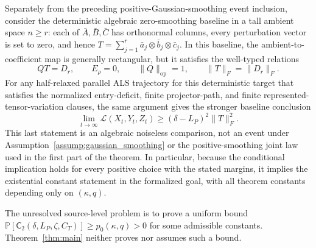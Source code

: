 \begin{theorem}
Separately from the preceding positive-Gaussian-smoothing event inclusion,
consider the deterministic algebraic zero-smoothing baseline in a tall
ambient space $n\geq r$: each of $\bar A,\bar B,\bar C$ has orthonormal
columns, every perturbation vector is set to zero, and hence
$T=\sum_{j=1}^r\bar a_j\otimes\bar b_j\otimes\bar c_j$.  In this baseline,
the ambient-to-coefficient map is generally rectangular, but it satisfies the
well-typed relations
\[
QT=D_r,
\qquad E_\rho=0,
\qquad \|Q\|_{\mathrm{op}}=1,
\qquad \|T\|_F=\|D_r\|_F.
\]
For any half-relaxed parallel ALS trajectory for this deterministic target
that satisfies the normalized entry-deficit, finite projector-path, and
finite represented-tensor-variation clauses, the same argument gives the
stronger baseline conclusion
\[
\lim_{t\to\infty}\mathcal L(X_t,Y_t,Z_t)
\geq(\delta-L_P)^2\|T\|_F^2.
\]
This last statement is an algebraic noiseless comparison, not an event under
Assumption~\ref{assump:gaussian_smoothing} or the positive-smoothing joint law
used in the first part of the theorem.
In particular, because the conditional implication holds for every positive
choice with the stated margins, it implies the existential constant statement
in the formalized goal, with all theorem constants depending only on
$(\kappa,q)$.
\end{theorem}

The unresolved source-level problem is to prove a uniform bound
$\mathbb P[\mathsf C_2(\delta,L_P,\zeta,C_T)]\geq p_0(\kappa,q)>0$ for
some admissible constants.  Theorem~\ref{thm:main} neither proves nor assumes
such a bound.
